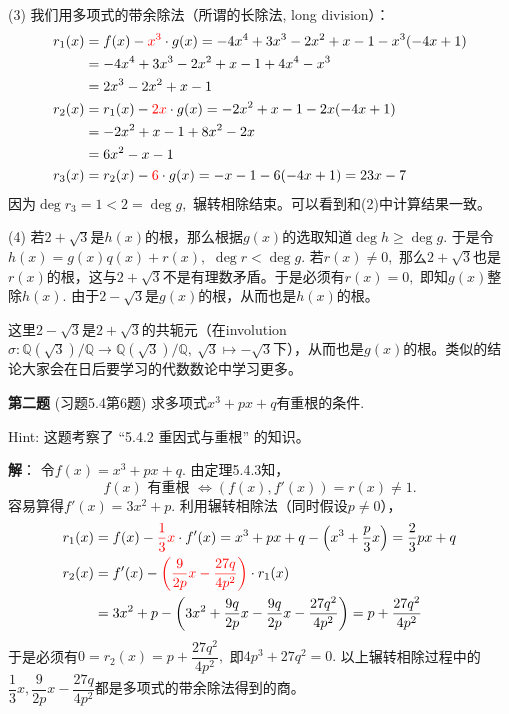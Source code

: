 \vspace{0.5em}

(3) 我们用多项式的带余除法（所谓的长除法, long division）：
\begin{align*}
r_1(x) & = f(x) - {\color{red} x^3} \cdot g(x) = - 4x^4 + 3x^3 - 2x^2 + x - 1 - x^3 (- 4x + 1) \\
& = - 4x^4 + 3x^3 - 2x^2 + x - 1 + 4x^4 - x^3 \\
& = 2x^3 - 2x^2 + x - 1 \\
r_2(x) & = r_1(x) - {\color{red} 2x} \cdot g(x) = - 2x^2 + x - 1 - 2x (- 4x + 1) \\
& = - 2x^2 + x - 1 + 8x^2 - 2x \\
& = 6x^2 - x - 1 \\
r_3(x) & = r_2(x) - {\color{red} 6} \cdot g(x) = - x - 1 - 6 (- 4x + 1) = 23 x - 7
\end{align*}
因为$\deg r_3 = 1 < 2 = \deg g,$ 辗转相除结束。可以看到和(2)中计算结果一致。

\vspace{0.5em}

(4) 若$2 + \sqrt{3}$是$h(x)$的根，那么根据$g(x)$的选取知道$\deg h \geqslant \deg g.$ 于是令$h(x) = g(x) q(x) + r(x),$ $\deg r < \deg g.$ 若$r(x) \neq 0,$ 那么$2 + \sqrt{3}$也是$r(x)$的根，这与$2 + \sqrt{3}$不是有理数矛盾。于是必须有$r(x) = 0,$ 即知$g(x)$整除$h(x).$ 由于$2 - \sqrt{3}$是$g(x)$的根，从而也是$h(x)$的根。

这里$2 - \sqrt{3}$是$2 + \sqrt{3}$的共轭元（在involution $\sigma: \mathbb{Q}(\sqrt{3}) / \mathbb{Q} \to \mathbb{Q}(\sqrt{3}) / \mathbb{Q}, ~ \sqrt{3} \mapsto -\sqrt{3}$下），从而也是$g(x)$的根。类似的结论大家会在日后要学习的代数数论中学习更多。

\fi  %

\newpageorvspace

{\bf 第二题} (习题5.4第6题) 求多项式$x^3 + px + q$有重根的条件.

Hint: 这题考察了 ``5.4.2 重因式与重根'' 的知识。

\ifIncludeAnswer

\newpageorvspace

{\bf 解}： 令$f(x) = x^3 + px + q.$ 由定理5.4.3知，
$$f(x) \text{ 有重根 } \Longleftrightarrow \left( f(x), f'(x) \right) = r(x) \neq 1.$$
容易算得$f'(x) = 3x^2 + p.$ 利用辗转相除法（同时假设$p\neq 0$），
\begin{align*}
r_1(x) & = f(x) - {\color{red} \dfrac{1}{3}x} \cdot f'(x) = x^3 + px + q - \left( x^3 + \dfrac{p}{3}x \right) = \dfrac{2}{3}px + q \\
r_2(x) & = f'(x) - {\color{red} \left( \dfrac{9}{2p}x - \dfrac{27q}{4p^2} \right)} \cdot r_1(x) \\
& = 3x^2 + p - \left( 3x^2 + \dfrac{9q}{2p}x - \dfrac{9q}{2p}x - \dfrac{27q^2}{4p^2} \right) = p + \dfrac{27q^2}{4p^2}
\end{align*}
于是必须有$0 = r_2(x) = p + \dfrac{27q^2}{4p^2},$ 即$4p^3 + 27q^2 = 0.$ 以上辗转相除过程中的$\dfrac{1}{3}x, \dfrac{9}{2p}x - \dfrac{27q}{4p^2}$都是多项式的带余除法得到的商。

